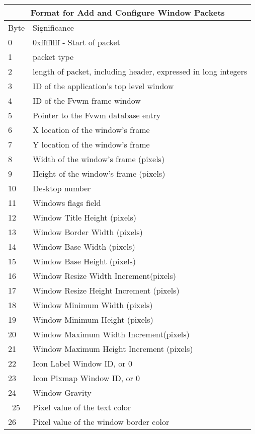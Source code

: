 \begin{table}
\begin{center}
\begin{tabular}[h]{|l|l|} \hline
\multicolumn{2}{|c|}{Format for Add and Configure Window Packets} \\ \hline
Byte &Significance \\\hline
0    & 0xffffffff - Start of packet \\
1    & packet type \\
2    & length of packet, including header, expressed in long integers
\\ \hline
3    & ID of the application's top level window \\
4    & ID of the Fvwm frame window \\
5    & Pointer to the Fvwm database entry \\
6    & X location of the window's frame \\
7    & Y location of the window's frame\\
8    & Width of the window's frame (pixels) \\
9    & Height of the window's frame (pixels) \\
10   & Desktop number\\ 
11   & Windows flags field\\
12   & Window Title Height (pixels) \\
13   & Window Border Width (pixels) \\
14   & Window Base Width (pixels) \\  
15   & Window Base Height (pixels) \\  
16   & Window Resize Width Increment(pixels) \\  
17   & Window Resize Height Increment (pixels) \\  
18   & Window Minimum Width (pixels) \\  
19   & Window Minimum Height (pixels) \\  
20   & Window Maximum Width Increment(pixels) \\  
21   & Window Maximum Height Increment (pixels) \\
22   & Icon Label Window ID, or 0\\
23   & Icon Pixmap Window ID, or 0\\ 
24   & Window Gravity\\  \
25   & Pixel value of the text color \\
26   & Pixel value of the window border color \\ \hline
\end{tabular}
\end{center}
\end{table}


